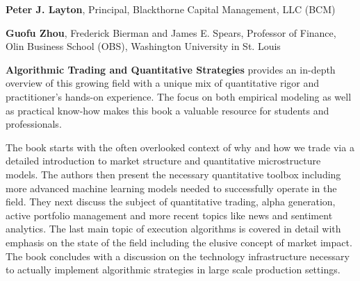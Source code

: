 \pagestyle{empty}


 \par
{%
\begin{flushright}
\begin{minipage}{0.6\textwidth}
\textbf{Peter J. Layton}, Principal, Blackthorne Capital Management, LLC (BCM)
\end{minipage}
\end{flushright} 
\twomedskip
}


 \par
{%
\begin{flushright}
\begin{minipage}{0.6\textwidth}
\textbf{Guofu Zhou}, Frederick Bierman and James E. Spears, Professor of Finance, Olin Business School (OBS), Washington University in St. Louis 
\end{minipage}
\end{flushright}
} \medskip



\newpage



\noindent\textbf{Algorithmic Trading and Quantitative Strategies} provides an in-depth overview of this growing field with a unique mix of quantitative rigor and practitioner's hands-on experience. The focus on both empirical modeling as well as practical know-how makes this book a valuable resource for students and professionals. \twomedskip


\noindent The book starts with the often overlooked context of why and how we trade via a detailed introduction to market structure and quantitative microstructure models. The authors then present the necessary quantitative toolbox including more advanced machine learning models needed to successfully operate in the field. They next discuss the subject of quantitative trading, alpha generation, active portfolio management and more recent topics like news and sentiment analytics. The last main topic of execution algorithms is covered in detail  with emphasis on the state of the field including the elusive concept of market impact. The book concludes with a discussion on the technology infrastructure necessary to actually implement algorithmic strategies in large scale production settings. \twomedskip


